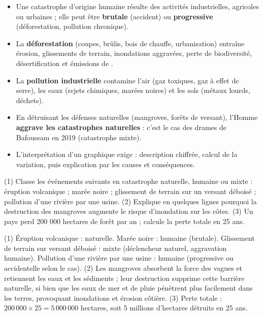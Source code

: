 \documentclass[11pt]{article}
\newcommand{\cle}[1]{{\popxbold\color{popdark}#1}}
\begin{document}
\begin{aretenir}
\begin{itemize}
\item Une catastrophe d'origine humaine résulte des activités industrielles, agricoles ou urbaines ; elle peut être \textbf{brutale} (accident) ou \textbf{progressive} (déforestation, pollution chronique).
\item La \textbf{déforestation} (coupes, brûlis, bois de chauffe, urbanisation) entraîne érosion, glissements de terrain, inondations aggravées, perte de biodiversité, désertification et émissions de .
\item La \textbf{pollution industrielle} contamine l'air (gaz toxiques, gaz à effet de serre), les eaux (rejets chimiques, marées noires) et les sols (métaux lourds, déchets).
\item En détruisant les défenses naturelles (mangroves, forêts de versant), l'Homme \textbf{aggrave les catastrophes naturelles} : c'est le cas des drames de Bafoussam en 2019 (\cle{catastrophe mixte}).
\item L'interprétation d'un graphique exige : description chiffrée, calcul de la variation, puis explication par les causes et conséquences.
\end{itemize}
\end{aretenir}

\begin{exercice}
(1) Classe les événements suivants en catastrophe naturelle, humaine ou mixte : éruption volcanique ; marée noire ; glissement de terrain sur un versant déboisé ; pollution d'une rivière par une usine. (2) Explique en quelques lignes pourquoi la destruction des mangroves augmente le risque d'inondation sur les côtes. (3) Un pays perd 200 000 hectares de forêt par an ; calcule la perte totale en 25 ans.
\end{exercice}

\begin{corrige}[Exercice]
(1) Éruption volcanique : naturelle. Marée noire : humaine (brutale). Glissement de terrain sur versant déboisé : mixte (déclencheur naturel, aggravation humaine). Pollution d'une rivière par une usine : humaine (progressive ou accidentelle selon le cas).
(2) Les mangroves absorbent la force des vagues et retiennent les eaux et les sédiments ; leur destruction supprime cette barrière naturelle, si bien que les eaux de mer et de pluie pénètrent plus facilement dans les terres, provoquant inondations et érosion côtière.
(3) Perte totale : $200\,000 \times 25 = 5\,000\,000$ hectares, soit 5 millions d'hectares détruits en 25 ans.
\end{corrige}
\end{document}

